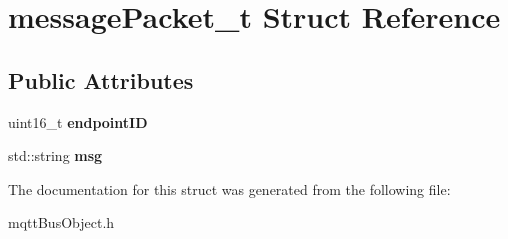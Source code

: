 \hypertarget{structmessagePacket__t}{}\section{message\+Packet\+\_\+t Struct Reference}
\label{structmessagePacket__t}
\subsection*{Public Attributes}
\begin{DoxyCompactItemize}
\item 
uint16\+\_\+t {\bfseries endpoint\+ID}\hypertarget{structmessagePacket__t_a0f00a3bb3219c5f6a85366925b7eef20}{}\label{structmessagePacket__t_a0f00a3bb3219c5f6a85366925b7eef20}

\item 
std\+::string {\bfseries msg}\hypertarget{structmessagePacket__t_a7867f2744ee482cefb7a30ac816d633d}{}\label{structmessagePacket__t_a7867f2744ee482cefb7a30ac816d633d}

\end{DoxyCompactItemize}


The documentation for this struct was generated from the following file\+:\begin{DoxyCompactItemize}
\item 
mqtt\+Bus\+Object.\+h\end{DoxyCompactItemize}
